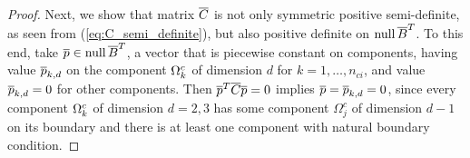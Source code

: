 \begin{proof}
Next, we show that matrix $\overline{C}$ is not only symmetric positive 
semi-definite, as seen from (\ref{eq:C_semi_definite}), but also positive definite on 
$\text{null}\,\overline{B}^T$. To this end, take $\overline{p} \in 
\mbox{null}\,\overline{B}^T$, a vector  
that is piecewise constant on components, having value $\overline{p}_{k,d}$ on the 
component $\Omega^c_k$ of dimension $d$ for $k=1,\dots, n_{ci}$, and value 
$\overline{p}_{k,d}=0$ for other components. 
Then $\overline{p}^T \overline{C}\overline{p}=0$ implies 
$\overline{p}=\overline{p}_{k,d}=0$, since every component $\Omega^c_k$ of dimension $d=2,3$ 
has some component $\Omega^c_j$ of dimension $d-1$ on its boundary and there is 
at least one component with natural boundary condition.



\end{proof}
